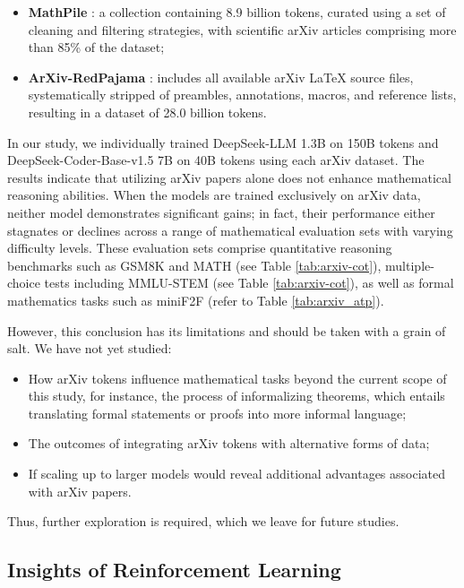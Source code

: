 \begin{itemize}[topsep=0pt]
\begin{itemize}[topsep=0pt]
\begin{itemize}[topsep=0pt]
    \item \textbf{MathPile} \citep{mathpile}: a collection containing 8.9 billion tokens, curated using a set of cleaning and filtering strategies, with scientific arXiv articles comprising more than 85\% of the dataset;
    \item \textbf{ArXiv-RedPajama} \citep{redpajama}: includes all available arXiv LaTeX source files, systematically stripped of preambles, annotations, macros, and reference lists, resulting in a dataset of 28.0 billion tokens.
\end{itemize}

In our study, we individually trained DeepSeek-LLM 1.3B on 150B tokens and DeepSeek-Coder-Base-v1.5 7B on 40B tokens using each arXiv dataset. The results indicate that utilizing arXiv papers alone does not enhance mathematical reasoning abilities. When the models are trained exclusively on arXiv data, neither model demonstrates significant gains; in fact, their performance either stagnates or declines across a range of mathematical evaluation sets with varying difficulty levels. These evaluation sets comprise quantitative reasoning benchmarks such as GSM8K and MATH (see Table \ref{tab:arxiv-cot}), multiple-choice tests including MMLU-STEM (see Table \ref{tab:arxiv-cot}), as well as formal mathematics tasks such as miniF2F (refer to Table \ref{tab:arxiv_atp}).

However, this conclusion has its limitations and should be taken with a grain of salt. We have not yet studied:

\begin{itemize}[topsep=0pt]
    \item How arXiv tokens influence mathematical tasks beyond the current scope of this study, for instance, the process of informalizing theorems, which entails translating formal statements or proofs into more informal language;
    \item The outcomes of integrating arXiv tokens with alternative forms of data;
    \item If scaling up to larger models would reveal additional advantages associated with arXiv papers.
\end{itemize}

Thus, further exploration is required, which we leave for future studies.

\subsection{Insights of Reinforcement Learning}

\end{itemize}
\end{itemize}
